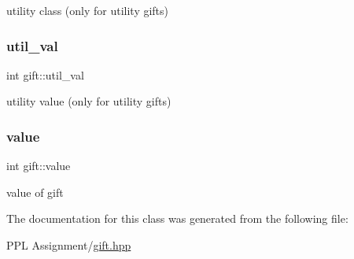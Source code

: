 utility class (only for utility gifts) \mbox{\label{classgift_a2fe42df4de2504a0bc88376682a1330c}} 
\subsubsection{\texorpdfstring{util\+\_\+val}{util\_val}}
{\footnotesize\ttfamily int gift\+::util\+\_\+val}

utility value (only for utility gifts) \mbox{\label{classgift_aa9e6fcf5bc68d7f151e7a853a25dcbeb}} 
\subsubsection{\texorpdfstring{value}{value}}
{\footnotesize\ttfamily int gift\+::value}

value of gift 

The documentation for this class was generated from the following file\+:\begin{DoxyCompactItemize}
\item 
P\+P\+L Assignment/\hyperlink{gift_8hpp}{gift.\+hpp}\end{DoxyCompactItemize}
